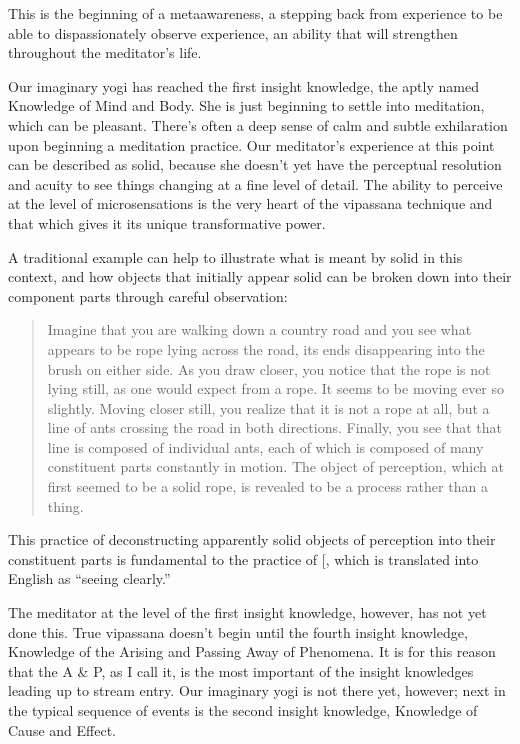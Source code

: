\documentclass[a5paper,10pt,english]{book}
\begin{document}
\sphinxAtStartPar
This is the beginning of a meta\sphinxhyphen{}awareness, a stepping back from
experience to be able to dispassionately observe experience, an ability
that will strengthen throughout the meditator’s life.

\sphinxAtStartPar
Our imaginary yogi has reached the first insight knowledge, the aptly
named Knowledge of Mind and Body. She is just beginning to settle into
meditation, which can be pleasant. There’s often a deep sense of calm
and subtle exhilaration upon beginning a meditation practice. Our
meditator’s experience at this point can be described as solid, because
she doesn’t yet have the perceptual resolution and acuity to see things
changing at a fine level of detail. The ability to perceive at the level
of micro\sphinxhyphen{}sensations is the very heart of the vipassana technique and
that which gives it its unique transformative power.

\sphinxAtStartPar
A traditional example can help to illustrate what is meant by solid in
this context, and how objects that initially appear solid can be broken
down into their component parts through careful observation:
\begin{quote}

\sphinxAtStartPar
Imagine that you are walking down a country road and you see what
appears to be rope lying across the road, its ends disappearing into
the brush on either side. As you draw closer, you notice that the
rope is not lying still, as one would expect from a rope. It seems
to be moving ever so slightly. Moving closer still, you realize that
it is not a rope at all, but a line of ants crossing the road in
both directions. Finally, you see that that line is composed of
individual ants, each of which is composed of many constituent parts
constantly in motion. The object of perception, which at first
seemed to be a solid rope, is revealed to be a process rather than a
thing.
\end{quote}

\sphinxAtStartPar
This practice of deconstructing apparently solid objects of perception
into their constituent parts is fundamental to the practice of
 {[}\sphinxurl{http://en.wikipedia.org/wiki/Vipassan\%C4\%81}{]}, which is
translated into English as “seeing clearly.”

\sphinxAtStartPar
The meditator at the level of the first insight knowledge, however, has
not yet done this. True vipassana doesn’t begin until the fourth insight
knowledge, Knowledge of the Arising and Passing Away of Phenomena. It is
for this reason that the A \& P, as I call it, is the most important of
the insight knowledges leading up to stream entry. Our imaginary yogi is
not there yet, however; next in the typical sequence of events is the
second insight knowledge, Knowledge of Cause and Effect.
\end{document}
